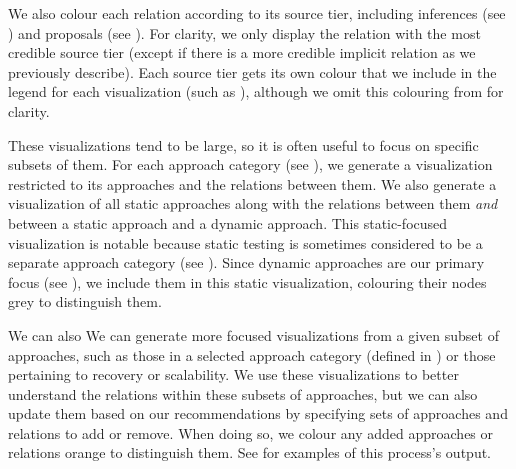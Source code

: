     We also colour each relation according to its source tier, including
    inferences (see ) and proposals (see ). For
    clarity, we only display the relation with the most credible source tier
    (except if there is a more credible implicit relation as we previously
    describe). Each source tier gets its own colour that we include in the
    legend for each visualization (such as ),
    although we omit this colouring from  for clarity.

\fi
These visualizations tend to be large, so it is often useful to focus on
specific subsets of them. \ifnotpaper For each approach category (see
    ), we generate a visualization restricted to its approaches
    and the relations between them. We also generate a visualization of all static
    approaches along with the relations between them \emph{and} between a
    static approach and a dynamic approach. This static-focused visualization is
    notable because static testing is sometimes considered to be a separate
    approach category (see ). Since dynamic
    approaches are our primary focus (see ), we include them
    in this static visualization, colouring their nodes grey to distinguish them.

    We can also \else We can \fi generate more focused visualizations from a
given subset of approaches, such as \ifnotpaper\else those in a selected
    approach category (defined in ) or \fi those pertaining to
recovery or scalability\ifnotpaper.
We use these visualizations to better understand the relations within these
subsets of approaches, but we can also update them based on
our recommendations by specifying sets of approaches and relations to add or
remove. %
When doing so, we colour any added approaches or relations orange to
distinguish them. %
See  for examples of this process's output.


\else
\flawMnfstsTable{}
\flawDmnsTable{}
\fi
